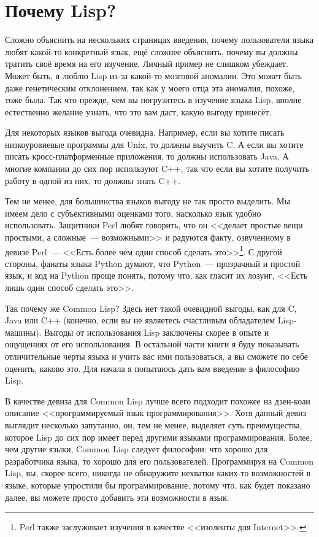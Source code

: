 \section{Почему Lisp?}

Сложно объяснить на нескольких страницах введения, почему пользователи языка любят
какой-то конкретный язык, ещё сложнее объяснить, почему вы должны тратить своё время на
его изучение. Личный пример не слишком убеждает. Может быть, я люблю Lisp из-за какой-то
мозговой аномалии. Это может быть даже генетическим отклонением, так
как у моего отца эта аномалия, похоже, тоже была. Так что прежде, чем вы погрузитесь в изучение языка
Lisp, вполне естественно желание узнать, что это вам даст, какую выгоду
принесёт.

Для некоторых языков выгода очевидна. Например, если вы хотите писать низкоуровневые
программы для Unix, то должны выучить C. А если вы хотите писать кросс-платформенные
приложения, то должны использовать Java. А многие компании до сих пор используют
C++, так что если вы хотите получить работу в одной из них, то должны знать C++.

Тем не менее, для большинства языков выгоду не так просто выделить. Мы имеем дело с
субъективными оценками того, насколько язык удобно использовать. Защитники Perl любят
говорить, что он <<делает простые вещи простыми, а сложные~--- возможными>> и радуются факту,
озвученному в девизе Perl~--- <<Есть более чем один способ сделать это>>\footnote{Perl
  также заслуживает изучения в качестве <<изоленты для Internet>>.}. С другой стороны,
фанаты языка Python думают, что Python~--- прозрачный и простой язык, и код на Python проще
понять, потому что, как гласит их лозунг, <<Есть лишь один способ сделать это>>.

Так почему же Common Lisp? Здесь нет такой очевидной выгоды, как для C, Java или C++
(конечно, если вы не являетесь счастливым обладателем Lisp-машины). Выгоды от использования
Lisp заключены скорее в опыте и ощущениях от его использования. В остальной части книги
я буду показывать отличительные черты языка и учить вас ими пользоваться, а вы сможете
по себе оценить, каково это. Для начала я попытаюсь дать вам введение в философию Lisp.

В качестве девиза для Common Lisp лучше всего подходит похожее на дзен-коан описание
<<программируемый язык программирования>>. Хотя данный девиз выглядит несколько запутанно,
он, тем не менее, выделяет суть преимущества, которое Lisp до сих пор имеет перед другими
языками программирования. Более, чем другие языки, Common Lisp следует философии: что
хорошо для разработчика языка, то хорошо для его пользователей. Программируя на Common
Lisp, вы, скорее всего, никогда не обнаружите нехватки каких-то возможностей в языке,
которые упростили бы программирование, потому что, как будет показано далее, вы можете
просто добавить эти возможности в язык.

